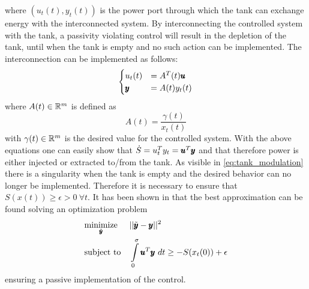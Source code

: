where $(u_t(t), y_t(t))$ is the power port through which the tank can exchange energy with the interconnected system. By interconnecting the controlled system with the tank, a passivity violating control will result in the depletion of the tank, until when the tank is empty and no such action can be implemented. The interconnection can be implemented as follows:
\begin{equation}
\begin{cases}
    u_t(t) &= A^T(t) \pmb{u} \\
    \pmb{y} &= A(t) y_t(t)
\end{cases}
\end{equation}
where $A(t) \in \mathbb{R}^{m}$ is defined as
\begin{equation} \label{eq:tank_modulation}
    A(t) = \frac{\gamma(t)}{x_t(t)}
\end{equation}
with $\gamma(t) \in \mathbb{R}^{m}$ is the desired value for the controlled system. With the above equations one can easily show that $\dot{S} = u_t^T y_t = \pmb{u}^T \pmb{y}$ and that therefore power is either injected or extracted to/from the tank. As visible in \eqn \ref{eq:tank_modulation} there is a singularity when the tank is empty and the desired behavior can no longer be implemented. Therefore it is necessary to ensure that $S(x(t)) \geq \epsilon > 0 \ \forall t$.  It has been shown in \cite{secchi2019energy} that the best approximation can be found solving an optimization problem 
\begin{equation}
\begin{aligned}
    & \underset{\tilde{\pmb{y}}}{\text{minimize}} 
    & & ||\tilde{\pmb{y}} - \pmb{y}||^2 \\
    & \text{subject to} 
    & & \int\limits_{0}^{\sigma} \pmb{u}^T \pmb{y}\ dt \geq -S(x_t(0)) + \epsilon 
\end{aligned}
\end{equation}
ensuring a passive implementation of the control.  

